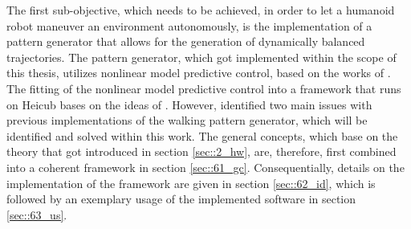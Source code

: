 
\label{sec::6_pg}
The first sub-objective, which needs to be achieved, in order to let a humanoid robot maneuver an environment autonomously, is the implementation of a pattern generator that allows for the generation of dynamically balanced trajectories. The pattern generator, which got implemented within the scope of this thesis, utilizes nonlinear model predictive control, based on the works of \cite{naveau2016reactive}. The fitting of the nonlinear model predictive control into a framework that runs on Heicub bases on the ideas of \cite{stein2017closed}. However, \cite{stein2017closed} identified two main issues with previous implementations of the walking pattern generator, which will be identified and solved within this work. The general concepts, which base on the theory that got introduced in section \ref{sec::2_hw}, are, therefore, first combined into a coherent framework in section \ref{sec::61_gc}. Consequentially, details on the implementation of the framework are given in section \ref{sec::62_id}, which is followed by an exemplary usage of the implemented software in section \ref{sec::63_us}.